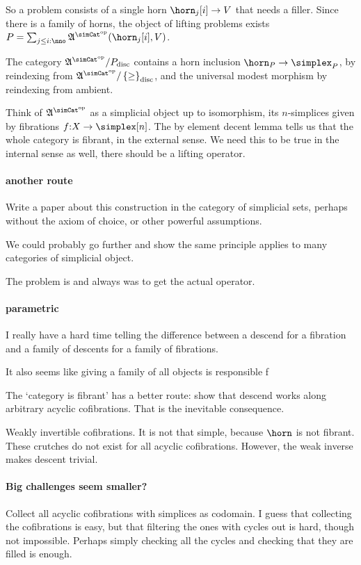 \documentclass[csh.tex]{subfiles}
\begin{document}
So a problem consists of a single horn $\horn_j[i]\to V$ that needs a filler. Since there is a family of horns, the object of lifting problems exists $P = \sum_{j\leq i\of\nno}\ambient\s(\horn_j[i], V)$. 

The category $\ambient\s/P\disc$ contains a horn inclusion $\horn_P\to\simplex_P$, by reindexing from $\ambient\s/\set\geq\disc$, and the universal modest morphism by reindexing from ambient.

Think of $\ambient\s$ as a simplicial object up to isomorphism, its $n$-simplices given by fibrations $f\of X\to \simplex[n]$. The by element decent lemma tells us that the whole category is fibrant, in the external sense. We need this to be true in the internal sense as well, there should be a lifting operator.

\paragraph{another route}
Write a paper about this construction in the category of simplicial sets, perhaps without the axiom of choice, or other powerful assumptions.

We could probably go further and show the same principle applies to many categories of simplicial object.

The problem is and always was to get the actual operator.

\paragraph{parametric}
I really have a hard time telling the difference between a descend for a fibration and a family of descents for a family of fibrations.

It also seems like giving a family of all objects is responsible f

The `category is fibrant' has a better route: show that descend works along arbitrary acyclic cofibrations. That is the inevitable consequence.

Weakly invertible cofibrations. It is not that simple, because $\horn$ is not fibrant. These crutches do not exist for all acyclic cofibrations. However, the weak inverse makes descent trivial.


\paragraph{Big challenges seem smaller?}
Collect all acyclic cofibrations with simplices as codomain.
I guess that collecting the cofibrations is easy, but that filtering the ones with cycles out is hard, though not impossible. Perhaps simply checking all the cycles and checking that they are filled is enough.
\end{document}
